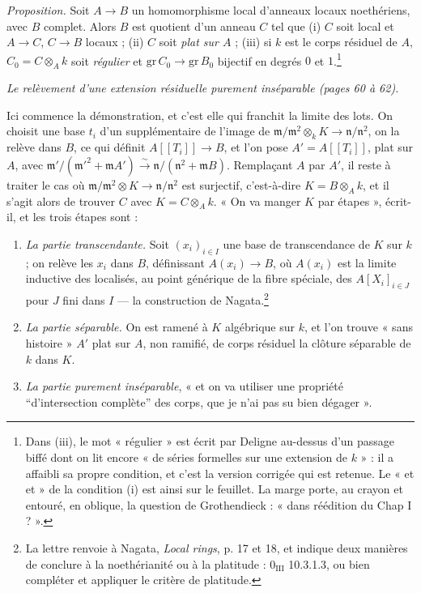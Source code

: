 \documentclass[11pt,a4paper]{article}
\begin{document}
\emph{Proposition.} Soit $A \to B$ un homomorphisme local d'anneaux locaux
noethériens, avec $B$ complet. Alors $B$ est quotient d'un anneau $C$ tel que
(i) $C$ soit local et $A \to C$, $C \to B$ locaux ; (ii) $C$ soit \emph{plat sur
$A$} ; (iii) si $k$ est le corps résiduel de $A$, $C_{0} = C \otimes_{A} k$ soit
\emph{régulier} et $\mathrm{gr}\,C_{0} \to \mathrm{gr}\,B_{0}$ bijectif en
degrés $0$ et $1$.\footnote{Dans (iii), le mot « régulier » est écrit par Deligne
au-dessus d'un passage biffé dont on lit encore « de séries formelles sur une
extension de $k$ » : il a affaibli sa propre condition, et c'est la version
corrigée qui est retenue. Le « et et » de la condition (i) est ainsi sur le
feuillet. La marge porte, au crayon et entouré, en oblique, la question de
Grothendieck : « dans réédition du Chap I ? ».}

\emph{Le relèvement d'une extension résiduelle purement inséparable (pages 60 à 62).}

Ici commence la démonstration, et c'est elle qui franchit la limite des lots. On
choisit une base $t_{i}$ d'un supplémentaire de l'image de
$\mathfrak{m}/\mathfrak{m}^{2} \otimes_{k} K \to
\mathfrak{n}/\mathfrak{n}^{2}$, on la relève dans $B$, ce qui définit
$A[[T_{i}]] \to B$, et l'on pose $A' = A[[T_{i}]]$, plat sur $A$, avec
$\mathfrak{m}'/(\mathfrak{m}'^{2} + \mathfrak{m}A') \xrightarrow{\sim}
\mathfrak{n}/(\mathfrak{n}^{2} + \mathfrak{m}B)$. Remplaçant $A$ par $A'$, il
reste à traiter le cas où $\mathfrak{m}/\mathfrak{m}^{2} \otimes K \to
\mathfrak{n}/\mathfrak{n}^{2}$ est surjectif, c'est-à-dire $K = B \otimes_A k$,
et il s'agit alors de trouver $C$ avec $K = C \otimes_A k$. « On va manger $K$
par étapes », écrit-il, et les trois étapes sont :

\begin{enumerate}
  \item[a)] \emph{La partie transcendante.} Soit $(x_{i})_{i \in I}$ une base de
  transcendance de $K$ sur $k$ ; on relève les $x_{i}$ dans $B$, définissant
  $A(x_{i}) \to B$, où $A(x_{i})$ est la limite inductive des localisés, au
  point générique de la fibre spéciale, des $A[X_{i}]_{i \in J}$ pour $J$ fini
  dans $I$ — la construction de Nagata.\footnote{La lettre renvoie à Nagata,
  \emph{Local rings}, p. 17 et 18, et indique deux manières de conclure à la
  noethérianité ou à la platitude : $0_{\mathrm{III}}$ 10.3.1.3, ou bien
  compléter et appliquer le critère de platitude.}
  \item[b)] \emph{La partie séparable.} On est ramené à $K$ algébrique sur $k$,
  et l'on trouve « sans histoire » $A'$ plat sur $A$, non ramifié, de corps
  résiduel la clôture séparable de $k$ dans $K$.
  \item[c)] \emph{La partie purement inséparable}, « et on va utiliser une
  propriété “d'intersection complète” des corps, que je n'ai pas su bien
  dégager ».
\end{enumerate}
\end{document}
